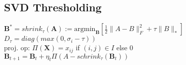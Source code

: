 \subsection*{SVD Thresholding}
$\textbf{B}^* = shrink_\tau (\textbf{A}) := \text{argmin}_\textbf{B}\left[\frac{1}{2}\|A-B\|_F^2+\tau \|B\|_*\right]$ \\
$D_\tau = diag(max(0, \sigma_i - \tau))$ \\
proj. op: $\Pi(\textbf{X}) = x_{ij}$ if $(i,j) \in I$ else $0$ \\
$ \textbf{B}_{t+1} = \textbf{B}_t + \eta_t \Pi(A - schrink_\tau (\textbf{B}_t)) $